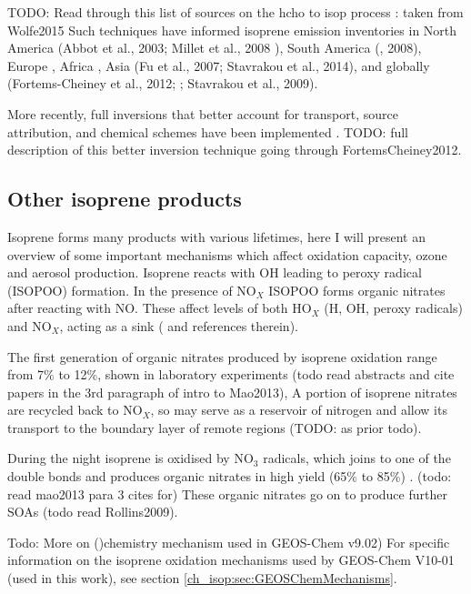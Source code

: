     TODO: Read through this list of sources on the hcho to isop process : taken from Wolfe2015
    Such techniques have informed isoprene emission inventories in North America (Abbot et al., 2003; Millet et al., 2008 \citep{Palmer2003,Millet2006,Palmer2006}), South America (\citep{Barkley2013}, 2008), Europe \citep{Curci2010,Dufour2009}, Africa \citep{Marais2012}, Asia (Fu et al., 2007; Stavrakou et al., 2014), and globally (Fortems-Cheiney et al., 2012; \citep{Shim2005}; Stavrakou et al., 2009).
    
    More recently, full inversions that better account for transport, source attribution, and chemical schemes have been implemented \citep{FortemsCheiney2012}.
    TODO: full description of this better inversion technique going through FortemsCheiney2012.
  
  \subsection{Other isoprene products}
    
    Isoprene forms many products with various lifetimes, here I will present an overview of some important mechanisms which affect oxidation capacity, ozone and aerosol production.
    Isoprene reacts with OH leading to peroxy radical (ISOPOO) formation.
    In the presence of NO$_X$ ISOPOO forms organic nitrates after reacting with NO.
    These affect levels of both HO$_X$ (H, OH, peroxy radicals) and NO$_X$, acting as a sink (\citet{Mao2013} and references therein).
    
    The first generation of organic nitrates produced by isoprene oxidation range from 7\% to 12\%, shown in laboratory experiments (todo read abstracts and cite papers in the 3rd paragraph of intro to Mao2013),
    A portion of isoprene nitrates are recycled back to NO$_X$, so may serve as a reservoir of nitrogen and allow its transport to the boundary layer of remote regions (TODO: as prior todo).
    
    During the night isoprene is oxidised by NO$_3$ radicals, which joins to one of the double bonds and produces organic nitrates in high yield (65\% to 85\%) \citep{Mao2013}. (todo: read mao2013 para 3 cites for)
    These organic nitrates go on to produce further SOAs \citep{Rollins2009} (todo read Rollins2009).
  
    Todo: More on \citep{Mao2013} ()chemistry mechanism used in GEOS-Chem v9.02)
    For specific information on the isoprene oxidation mechanisms used by GEOS-Chem V10-01 (used in this work), see section \ref{ch_isop:sec:GEOSChemMechanisms}.
    
